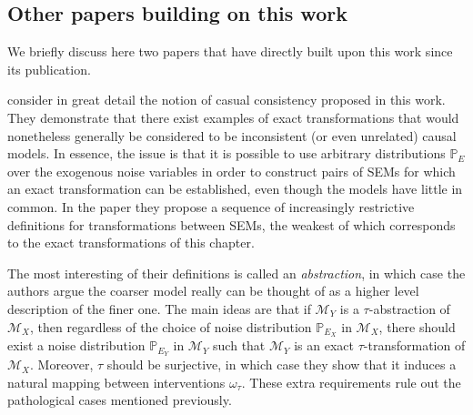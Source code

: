 \subsection{Other papers building on this work}

We briefly discuss here two papers that have directly built upon this work since its publication. 


\cite{sanders1} consider in great detail the notion of casual consistency proposed in this work. 
They demonstrate that there exist examples of exact transformations that would nonetheless generally be considered to be inconsistent (or even unrelated) causal models. 
In essence, the issue is that it is possible to use arbitrary distributions $\mathbb{P}_E$ over the exogenous noise variables in order to construct pairs of SEMs for which an exact transformation can be established, even though the models have little in common.
In the paper they propose a sequence of increasingly restrictive definitions for transformations between SEMs, the weakest of which corresponds to the exact transformations of this chapter.

The most interesting of their definitions is called an \emph{abstraction}, in which case the authors argue the coarser model really can be thought of as a higher level description of the finer one. 
The main ideas are that if $\mathcal{M}_Y$ is a $\tau$-abstraction of $\mathcal{M}_X$, then regardless of the choice of noise distribution $\mathbb{P}_{E_X}$ in $\mathcal{M}_X$, there should exist a noise distribution $\mathbb{P}_{E_Y}$ in $\mathcal{M}_Y$ such that $\mathcal{M}_Y$ is an exact $\tau$-transformation of $\mathcal{M}_X$. 
Moreover, $\tau$ should be surjective, in which case they show that it induces a natural mapping between interventions $\omega_\tau$.
These extra requirements rule out the pathological cases mentioned previously.

